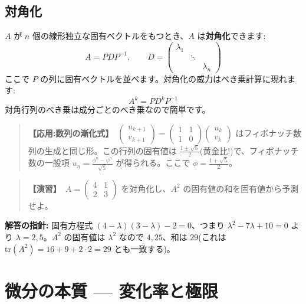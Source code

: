 \documentclass{article}
\begin{document}
\subsection{対角化}

\(A\) が \(n\) 個の線形独立な固有ベクトルをもつとき、\(A\) は\textbf{対角化}できます:
\[ A = P D P^{-1}, \qquad D = \begin{pmatrix} \lambda_1 & & \\ & \ddots & \\ & & \lambda_n \end{pmatrix} \]
ここで \(P\) の列に固有ベクトルを並べます。対角化の威力はべき乗計算に現れます:
\[ A^k = P D^k P^{-1} \]
対角行列のべき乗は成分ごとのべき乗なので簡単です。

\begin{quote}
\textbf{【応用:数列の漸化式】}\ \(\begin{pmatrix} u_{k+1} \\ v_{k+1} \end{pmatrix} = \begin{pmatrix} 1 & 1 \\ 1 & 0 \end{pmatrix} \begin{pmatrix} u_k \\ v_k \end{pmatrix}\) はフィボナッチ数列の生成と同じ形。この行列の固有値は \(\frac{1 \pm \sqrt{5}}{2}\)(黄金比!)で、フィボナッチ数の一般項 \(u_n = \frac{\phi^n - \psi^n}{\sqrt{5}}\) が得られる。ここで \(\phi = \frac{1+\sqrt{5}}{2}\)。
\end{quote}

\begin{quote}
\textbf{【演習】}\ \(A = \begin{pmatrix} 4 & 1 \\ 2 & 3 \end{pmatrix}\) を対角化し、\(A^2\) の固有値の和を固有値から予測せよ。
\end{quote}

\textbf{解答の指針:} 固有方程式 \((4-\lambda)(3-\lambda) - 2 = 0\)、つまり \(\lambda^2 - 7\lambda + 10 = 0\) より \(\lambda = 2, 5\)。\(A^2\) の固有値は \(\lambda^2\) なので \(4, 25\)、和は \(29\)(これは \(\mathrm{tr}(A^2) = 16 + 9 + 2 \cdot 2 = 29\) とも一致する)。

\section{微分の本質 — 変化率と極限}
\end{document}
